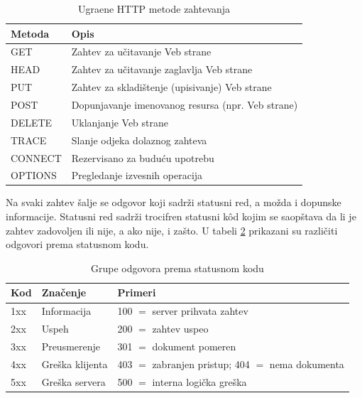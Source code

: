 \documentclass{article} %
\begin{document}
\begin{table}[h]
	\centering
	\renewcommand{\arraystretch}{1.2}
	\begin{tabular}{|l|l|}
		\hline
		\textbf{Metoda} & \textbf{Opis} \\
		\hline
		GET & Zahtev za u\v citavanje Veb strane \\
		\hline
		HEAD & Zahtev za u\v citavanje zaglavlja Veb strane \\
		\hline
		PUT & Zahtev za skladi\v stenje (upisivanje) Veb strane \\
		\hline
		POST & Dopunjavanje imenovanog resursa (npr. Veb strane) \\
		\hline
		DELETE & Uklanjanje Veb strane \\
		\hline
		TRACE & Slanje odjeka dolaznog zahteva \\
		\hline
		CONNECT & Rezervisano za budu\' cu upotrebu \\
		\hline
		OPTIONS & Pregledanje izvesnih operacija \\
		\hline
	\end{tabular}
	\caption{Ugra\dj ene HTTP metode zahtevanja}
	\label{tab: metodi}
\end{table}

\noindent Na svaki zahtev \v salje se odgovor koji sadr\v zi statusni red, a mo\v zda i dopunske informacije. Statusni red sadr\v zi trocifren statusni k\^ od kojim se saop\v stava da li je zahtev zadovoljen ili nije, a ako nije, i za\v sto. U tabeli \ref{tab: kodovi} prikazani su razli\v citi odgovori prema statusnom kodu.

\begin{table}[h]
	\centering
	\renewcommand{\arraystretch}{1.2}
	\begin{tabular}{|l|l|l|}
		\hline
		\textbf{Kod} & \textbf{Zna\v cenje} & \textbf{Primeri} \\
		\hline
		1xx & Informacija & 100 $=$ server prihvata zahtev \\
		\hline
		2xx & Uspeh & 200 $=$ zahtev uspeo \\
		\hline
		3xx & Preusmerenje & 301 $=$ dokument pomeren \\
		\hline
		4xx & Gre\v ska klijenta & 403 $=$ zabranjen pristup; 404 $=$ nema dokumenta \\
		\hline 
		5xx & Gre\v ska servera & 500 $=$ interna logi\v cka gre\v ska \\
		\hline
	\end{tabular}
	\caption{Grupe odgovora prema statusnom kodu}
	\label{tab: kodovi}
\end{table}
\end{document}
